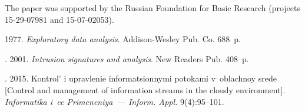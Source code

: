     

\vspace*{-9pt}

\Ack
\noindent
The paper was supported by the Russian Foundation for Basic Research 
(projects 15-29-07981 and 15-07-02053).



  \begin{multicols}{2}

\renewcommand{\bibname}{\protect\rmfamily References}

{\small\frenchspacing
 {%
 \begin{thebibliography}{99}
 1977. \textit{Exploratory data analysis}. Addison-Wesley Pub. 
Co. 688~p.

. 2001. 
\textit{Intrusion signatures and analysis}. New Readers Pub. 408~p. 

. 2015. Kontrol' i upravlenie 
informatsionnymi potokami v~oblachnoy srede [Control and management of 
information streams in the cloudy environment]. \textit{Informatika i~ee 
Primeneniya~--- Inform. Appl.} 9(4):95--101. 


\end{thebibliography}}}
\end{multicols}

